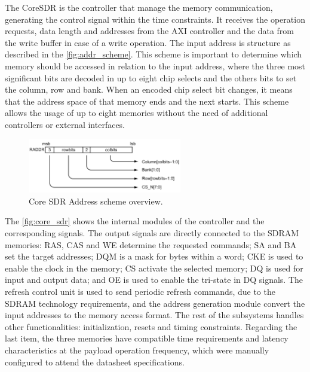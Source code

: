 The CoreSDR is the controller that manage the memory communication, generating the control signal within the time constraints. It receives the operation requests, data length and addresses from the AXI controller and the data from the write buffer in case of a write operation. The input address is structure as described in the \autoref{fig:addr_scheme}. This scheme is important to determine which memory should be accessed in relation to the input address, where the three most significant bits are decoded in up to eight chip selects and the others bits to set the column, row and bank. When an encoded chip select bit changes, it means that the address space of that memory ends and the next starts. This scheme allows the usage of up to eight memories without the need of additional controllers or external interfaces. 

\begin{figure}[!ht]
    \begin{center}
        \includegraphics[width=0.6\textwidth]{figures/addr_scheme_core_sdr.png}
        \caption{Core SDR Address scheme overview.}
        \label{fig:addr_scheme}
    \end{center}
\end{figure}

The \autoref{fig:core_sdr} shows the internal modules of the controller and the corresponding signals. The output signals are directly connected to the SDRAM memories: RAS, CAS and WE determine the requested commands; SA and BA set the target addresses; DQM is a mask for bytes within a word; CKE is used to enable the clock in the memory; CS activate the selected memory; DQ is used for input and output data; and OE is used to enable the tri-state in DQ signals. The refresh control unit is used to send periodic refresh commands, due to the SDRAM technology requirements, and the address generation module convert the input addresses to the memory access format. The rest of the subsystems handles other functionalities: initialization, resets and timing constraints. Regarding the last item, the three memories have compatible time requirements and latency characteristics at the payload operation frequency, which were manually configured to attend the datasheet specifications. 

